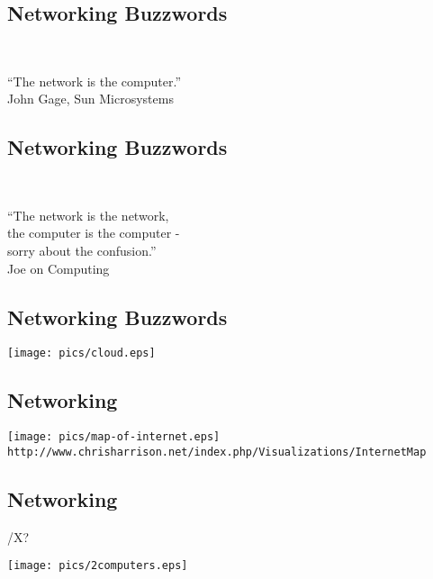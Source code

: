 \documentclass[xga]{xdvislides}
\begin{document}
\subsection{Networking Buzzwords}
\\

\newcommand{\gargantuan}{\fontsize{45}{50}\selectfont}
\gargantuan
\begin{center}
``The network is the computer.'' \\
\small
\vspace*{.5in}
John Gage, Sun Microsystems
\end{center}
\Normalsize

\subsection{Networking Buzzwords}
\\

\gargantuan
\begin{center}
``The network is the network, \\
the computer is the computer - \\
sorry about the confusion.'' \\
\small
\vspace*{.5in}
Joe on Computing
\end{center}
\Normalsize

\subsection{Networking Buzzwords}
\vspace*{\fill}
\begin{center}
	\texttt{[image: pics/cloud.eps]}
\end{center}
\vspace*{\fill}

\subsection{Networking}
\vspace*{\fill}
\begin{center}
	\texttt{[image: pics/map-of-internet.eps]} \\
	\vspace*{\fill}
	\small
	\verb+http://www.chrisharrison.net/index.php/Visualizations/InternetMap+
	\Normalsize
\end{center}

\subsection{Networking}
/X? %
\vspace*{\fill}
\begin{center}
	\texttt{[image: pics/2computers.eps]} \\
\end{center}
\vspace*{\fill}
\end{document}
